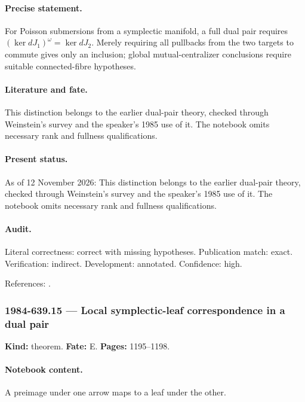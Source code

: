 \paragraph{Precise statement.} For Poisson submersions from a symplectic manifold, a full dual pair requires \((\ker dJ_1)^\omega=\ker dJ_2\). Merely requiring all pullbacks from the two targets to commute gives only an inclusion; global mutual-centralizer conclusions require suitable connected-fibre hypotheses.

\paragraph{Literature and fate.} This distinction belongs to the earlier dual-pair theory, checked through Weinstein's survey and the speaker's 1985 use of it. The notebook omits necessary rank and fullness qualifications.

\paragraph{Present status.} As of 12 November 2026: This distinction belongs to the earlier dual-pair theory, checked through Weinstein's survey and the speaker's 1985 use of it. The notebook omits necessary rank and fullness qualifications.

\paragraph{Audit.} Literal correctness: correct with missing hypotheses. Publication match: exact. Verification: indirect. Development: annotated. Confidence: high.

\noindent References: \citep{weinstein1983local,weinstein1985poisson,semenov1985dressing}.\par

\subsubsection{1984-639.15 --- Local symplectic-leaf correspondence in a dual pair}

\label{item:1984-639.15}

\noindent\textbf{Kind:} theorem. \textbf{Fate:} E. \textbf{Pages:} 1195--1198.\par

\paragraph{Notebook content.} A preimage under one arrow maps to a leaf under the other.

